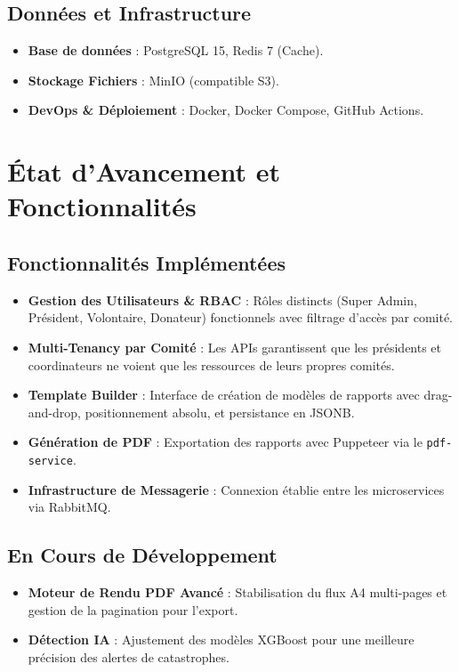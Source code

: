 \documentclass[12pt,a4paper]{report}
\begin{document}
\section{Données et Infrastructure}
\begin{itemize}
    \item \textbf{Base de données} : PostgreSQL 15, Redis 7 (Cache).
    \item \textbf{Stockage Fichiers} : MinIO (compatible S3).
    \item \textbf{DevOps \& Déploiement} : Docker, Docker Compose, GitHub Actions.
\end{itemize}

\chapter{État d'Avancement et Fonctionnalités}
\section{Fonctionnalités Implémentées}
\begin{itemize}
    \item \textbf{Gestion des Utilisateurs \& RBAC} : Rôles distincts (Super Admin, Président, Volontaire, Donateur) fonctionnels avec filtrage d'accès par comité.
    \item \textbf{Multi-Tenancy par Comité} : Les APIs garantissent que les présidents et coordinateurs ne voient que les ressources de leurs propres comités.
    \item \textbf{Template Builder} : Interface de création de modèles de rapports avec drag-and-drop, positionnement absolu, et persistance en JSONB.
    \item \textbf{Génération de PDF} : Exportation des rapports avec Puppeteer via le \texttt{pdf-service}.
    \item \textbf{Infrastructure de Messagerie} : Connexion établie entre les microservices via RabbitMQ.
\end{itemize}

\section{En Cours de Développement}
\begin{itemize}
    \item \textbf{Moteur de Rendu PDF Avancé} : Stabilisation du flux A4 multi-pages et gestion de la pagination pour l'export.
    \item \textbf{Détection IA} : Ajustement des modèles XGBoost pour une meilleure précision des alertes de catastrophes.
\end{itemize}
\end{document}
